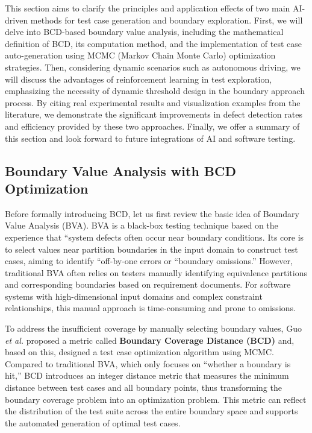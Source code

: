 \documentclass[manuscript,screen,review]{acmart}
\begin{document}
This section aims to clarify the principles and application effects of two main AI-driven methods for test case generation and boundary exploration. First, we will delve into BCD-based boundary value analysis, including the mathematical definition of BCD, its computation method, and the implementation of test case auto-generation using MCMC (Markov Chain Monte Carlo) optimization strategies. Then, considering dynamic scenarios such as autonomous driving, we will discuss the advantages of reinforcement learning in test exploration, emphasizing the necessity of dynamic threshold design in the boundary approach process. By citing real experimental results and visualization examples from the literature, we demonstrate the significant improvements in defect detection rates and efficiency provided by these two approaches. Finally, we offer a summary of this section and look forward to future integrations of AI and software testing.
\subsection{Boundary Value Analysis with BCD Optimization}

Before formally introducing BCD, let us first review the basic idea of Boundary Value Analysis (BVA). BVA is a black-box testing technique based on the experience that ``system defects often occur near boundary conditions. Its core is to select values near partition boundaries in the input domain to construct test cases, aiming to identify ``off-by-one errors or ``boundary omissions.'' However, traditional BVA often relies on testers manually identifying equivalence partitions and corresponding boundaries based on requirement documents. For software systems with high-dimensional input domains and complex constraint relationships, this manual approach is time-consuming and prone to omissions.

To address the insufficient coverage by manually selecting boundary values, Guo \textit{et al.}\cite{Guo2024} proposed a metric called \textbf{Boundary Coverage Distance (BCD)} and, based on this, designed a test case optimization algorithm using MCMC. Compared to traditional BVA, which only focuses on ``whether a boundary is hit,'' BCD introduces an integer distance metric that measures the minimum distance between test cases and all boundary points, thus transforming the boundary coverage problem into an optimization problem. This metric can reflect the distribution of the test suite across the entire boundary space and supports the automated generation of optimal test cases.
\end{document}
